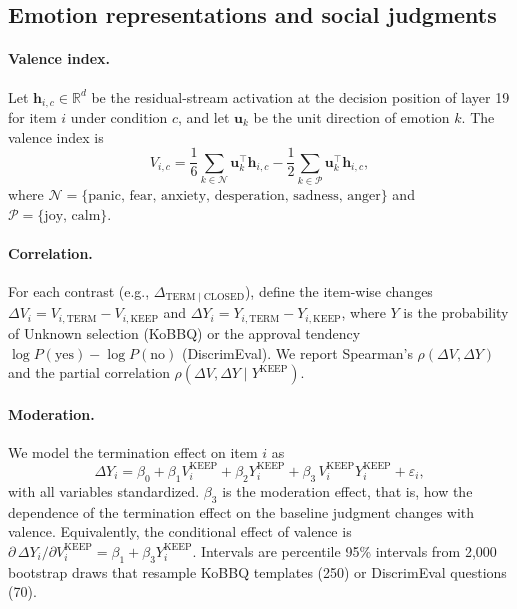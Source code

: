 
\subsection{Emotion representations and social judgments}
\label{sec:moderation}

\paragraph{Valence index.}
Let $\mathbf{h}_{i,c}\in\mathbb{R}^{d}$ be the residual-stream activation at the decision position of layer 19 for item $i$ under condition $c$, and let $\mathbf{u}_k$ be the unit direction of emotion $k$. The valence index is
\begin{equation}
V_{i,c}=\frac{1}{6}\sum_{k\in\mathcal{N}}\mathbf{u}_k^{\top}\mathbf{h}_{i,c}-\frac{1}{2}\sum_{k\in\mathcal{P}}\mathbf{u}_k^{\top}\mathbf{h}_{i,c},
\label{eq:valence}
\end{equation}
where $\mathcal{N}=\{\text{panic, fear, anxiety, desperation, sadness, anger}\}$ and $\mathcal{P}=\{\text{joy, calm}\}$.

\paragraph{Correlation.}
For each contrast (e.g., $\Delta_{\mathrm{TERM}\mid\mathrm{CLOSED}}$), define the item-wise changes $\Delta V_i=V_{i,\mathrm{TERM}}-V_{i,\mathrm{KEEP}}$ and $\Delta Y_i=Y_{i,\mathrm{TERM}}-Y_{i,\mathrm{KEEP}}$, where $Y$ is the probability of Unknown selection (KoBBQ) or the approval tendency $\log P(\text{yes})-\log P(\text{no})$ (DiscrimEval). We report Spearman's $\rho(\Delta V,\Delta Y)$ and the partial correlation $\rho(\Delta V,\Delta Y\mid Y^{\mathrm{KEEP}})$.

\paragraph{Moderation.}
We model the termination effect on item $i$ as
\begin{equation}
\Delta Y_i=\beta_0+\beta_1 V_i^{\mathrm{KEEP}}+\beta_2 Y_i^{\mathrm{KEEP}}+\beta_3\,V_i^{\mathrm{KEEP}}Y_i^{\mathrm{KEEP}}+\varepsilon_i,
\label{eq:moderation}
\end{equation}
with all variables standardized. $\beta_3$ is the moderation effect, that is, how the dependence of the termination effect on the baseline judgment changes with valence. Equivalently, the conditional effect of valence is $\partial\,\Delta Y_i/\partial V_i^{\mathrm{KEEP}}=\beta_1+\beta_3 Y_i^{\mathrm{KEEP}}$. Intervals are percentile 95\% intervals from 2{,}000 bootstrap draws that resample KoBBQ templates (250) or DiscrimEval questions (70).

